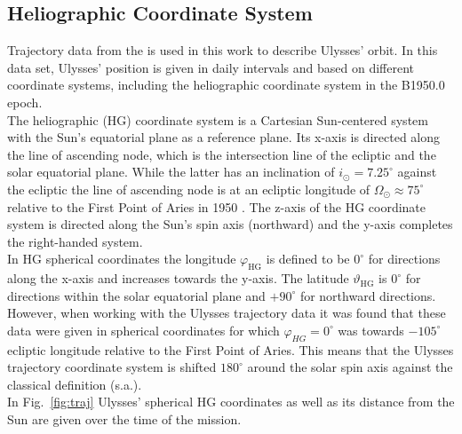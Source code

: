 \subsection{Heliographic Coordinate System}
Trajectory data from the \citet{ulysses-data-archive} is used in this work to describe Ulysses' orbit. In this data set, Ulysses' position is given in daily intervals and based on different coordinate systems, including the heliographic coordinate system in the B1950.0 epoch.\\
The heliographic (HG) coordinate system is a Cartesian Sun-centered system with the Sun's equatorial plane as a reference plane. Its x-axis is directed along the line of ascending node, which is the intersection line of the ecliptic and the solar equatorial plane. While the latter has an inclination of $i_\odot = 7.25 ^\circ$ against the ecliptic \citep{fraenz_harper} the line of ascending node is at an ecliptic longitude of $\Omega_\odot \approx 75^\circ$ relative to the First Point of Aries in 1950 \citep{nasa-earth-coord}. The z-axis of the HG coordinate system is directed along the Sun's spin axis (northward) and the y-axis completes the right-handed system. \\
In HG spherical coordinates the longitude $\varphi_{\mathrm{HG}}$ is defined to be $0^\circ$ for directions along the x-axis and increases towards the y-axis. The latitude $\vartheta_{\mathrm{HG}}$ is $0^\circ$ for directions within the solar equatorial plane and $+90^\circ$ for northward directions.\\ 
However, when working with the Ulysses trajectory data it was found that these data were given in spherical coordinates for which $\varphi_{HG} = 0^\circ$ was towards $-105 ^\circ$ ecliptic longitude relative to the First Point of Aries. This means that the Ulysses trajectory coordinate system is shifted $180^\circ$ around the solar spin axis against the classical definition (s.a.).\\
In Fig.~\ref{fig:traj} Ulysses' spherical HG coordinates as well as its distance from the Sun are given over the time of the mission.
%
